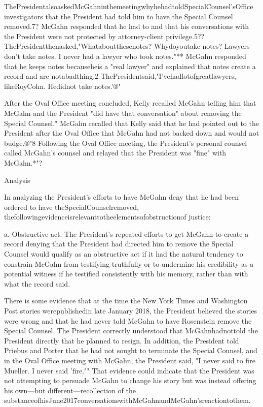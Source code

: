 ThePresidentalsoaskedMcGahninthemeetingwhyhehadtoldSpecialCounsel'sOffice investigators that the President had told him to have the Special Counsel removed.7?
McGahn responded that he had to and that his conversations with the President were not protected by attorney-client privilege.5??
ThePresidentthenasked,"Whataboutthesenotes? Whydoyoutake notes? Lawyers don't take notes.
I never had a lawyer who took notes."**
McGahn responded that he keeps notes becauseheis a "real lawyer" and explained that notes create a record and are notabadthing.2
ThePresidentsaid,"I'vehadlotofgreatlawyers, likeRoyCohn.
Hedidnot take notes.'®"

After the Oval Office meeting concluded, Kelly recalled McGahn telling him that McGahn and the President "did have that conversation" about removing the Special Counsel."
McGahn recalled that Kelly said that he had pointed out to the President after the Oval Office that McGahn had not backed down and would not budge.®"8
Following the Oval Office meeting, the President's personal counsel called McGahn's counsel and relayed that the President was "fine" with McGahn.*"?

Analysis

In analyzing the President's efforts to have McGahn deny that he had been ordered to have theSpecialCounselremoved, thefollowingevidenceisrelevanttotheelementsofobstructionof
justice:

a. Obstructive act.
The President's repeated efforts to get McGahn to create a record denying that the President had directed him to remove the Special Counsel would qualify as an obstructive act if it had the natural tendency to constrain McGahn from testifying truthfully or to undermine his credibility as a potential witness if he testified consistently with his memory, rather than with what the record said.

There is some evidence that at the time the New York Times and Washington Post stories werepublishedin late January 2018, the President believed the stories were wrong and that he had never told McGahn to have Rosenstein remove the Special Counsel.
The President correctly understood that McGahnhadnottold the President directly that he planned to resign.
In addition, the President told Priebus and Porter that he had not sought to terminate the Special Counsel, and in the Oval Office meeting with McGahn, the President said, "I never said to fire Mueller.
I never said 'fire.""
That evidence could indicate that the President was not attempting to persuade McGahn to change his story but was instead offering his own—but different—recollection of the substanceofhisJune2017conversationswithMcGahnandMcGahn'sreactiontothem.

